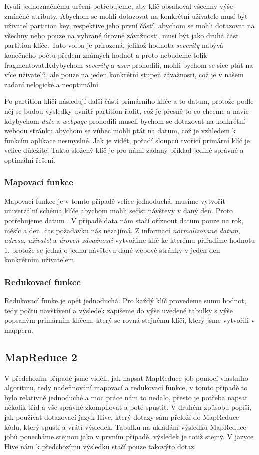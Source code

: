 \documentclass[thesis=M,czech]{FITthesis}[2012/06/26]
\begin{document}
Kvůli jednoznačnému určení potřebujeme, aby klíč obsahoval všechny výše zmíněné atributy. Abychom se mohli dotazovat na konkrétní uživatele musí být uživatel partition key, respektive jeho první částí, abychom se mohli dotazovat na všechny nebo pouze na vybrané úrovně závažnosti, musí být jako druhá část partition klíče. Tato volba je prirozená, jelikož hodnota \emph{severity} nabývá konečného počtu předem známých hodnot a proto nebudeme tolik fragmentovat.Kdybychom \emph{severity} a \emph{user} prohodili, mohli bychom se sice ptát na více uživatelů, ale pouze na jeden konkrétní  stupeň závažnosti, což je v našem zadaní nelogické a neoptimální.

Po partition klíči následují další části primárního klíče a to datum, protože podle něj se budou výsledky uvnitř partition řadit, což je přesně to co chceme a navíc kdybychom \emph{date} a \emph{webpage} prohodili museli bychom se dotazovat na konkrétní weboou stránku abychom se vůbec mohli ptát na datum, což je vzhledem k funkcím aplikace nesmyslné. Jak je vidět, pořadí sloupců tvořící primární klíč je velice důležite! Takto složený klíč je pro námi zadaný příklad jediné správné a optimální řešení.

\subsubsection{Mapovací funkce}
Mapovací funkce je v tomto případě velice jednoduchá, musíme vytvořit univerzální schéma klíče abychom mohli sečíst návštevy v daný den. Proto potřebujeme datum  . V případě data nám stačí oříznout datum pouze na rok, měsíc a den. čas požadavku nás nezajímá. Z informací \emph{normalizovane datum}, \emph{adresa}, \emph{uživatel} a \emph{úroveň závažnosti} vytvoříme klíč ke kterému přiřadíme hodnotu 1, protože se jedná o jednu návštevu dané webové stránky v jeden den konkrétním uživatelem. 

\subsubsection{Redukovací funkce}
Redukovací funke je opět jednoduchá. Pro každý klíč provedeme sumu hodnot, tedy počtu navštívení a výsledek zapíšeme do výše uvedené tabulky s výše popsaným primárním klíčem, který se rovná stejnému klíčí, který jsme vytvořili v mapperu. 

\subsection{MapReduce 2}
V předchozím případě jsme viděli, jak napsat MapReduce job pomocí vlastního algoritmu, tedy nadefinování mapovací a redukovací funkce, v tomto případě to bylo relativně jednoduché a moc práce nám to nedalo, přesto je potřeba napsat několik tříd a vše správně zkompilovat a poté spustit. V druhém způsobu popíši, jak používat dotazovací jazyk Hive, který dotazy sám přeloží do MapReduce kódu, který spustí a vrátí výsledek. Tabulku na ukládání výsledků MapReduce jobů ponecháme stejnou jako v prvním případě, výsledek je totiž stejný. V jazyce Hive nám k předchozímu výsledku stačí pouze takovýto dotaz.
\end{document}
